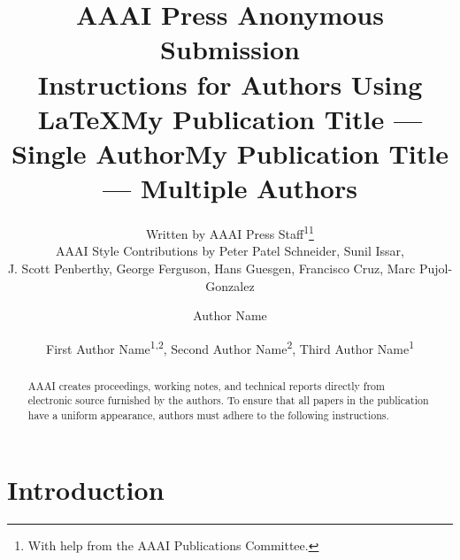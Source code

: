 \documentclass[letterpaper]{article} %
\title{AAAI Press Anonymous Submission\\Instructions for Authors Using \LaTeX{}}
\author{
    Written by AAAI Press Staff\textsuperscript{\rm 1}\thanks{With help from the AAAI Publications Committee.}\\
    AAAI Style Contributions by Peter Patel Schneider,
    Sunil Issar,\\
    J. Scott Penberthy,
    George Ferguson,
    Hans Guesgen,
    Francisco Cruz\equalcontrib\corresponding,
    Marc Pujol-Gonzalez\equalcontrib\corresponding
}
\title{My Publication Title --- Single Author}
\author {
    Author Name
}
\title{My Publication Title --- Multiple Authors}
\author {
    First Author Name\textsuperscript{\rm 1,\rm 2}\equalcontrib,
    Second Author Name\textsuperscript{\rm 2}\equalcontrib,
    Third Author Name\textsuperscript{\rm 1}\corresponding
}
\begin{document}
\maketitle

\begin{abstract}
    AAAI creates proceedings, working notes, and technical reports directly from electronic source furnished by the authors. To ensure that all papers in the publication have a uniform appearance, authors must adhere to the following instructions.
\end{abstract}


\section{Introduction}
\end{document}
